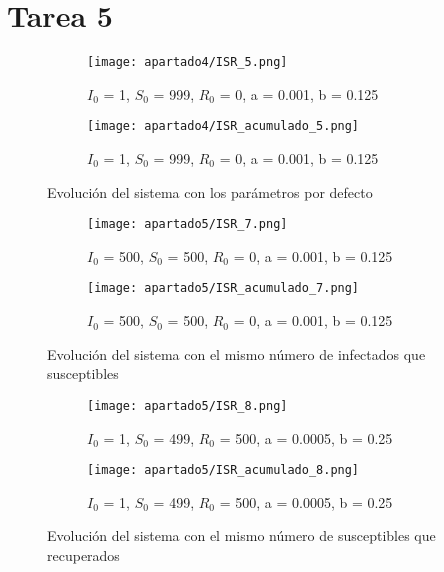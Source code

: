 \section{Tarea 5}
\begin{figure}[H]
	\centering
	\begin{subfigure}[b]{0.8\textwidth}
		\centering
		\texttt{[image: apartado4/ISR\_5.png]}
		\caption{$I_0$ = 1, $S_0$ = 999, $R_0$ = 0, a = 0.001, b = 0.125}
	\end{subfigure}
	\hfill
	\begin{subfigure}[b]{0.8\textwidth}
		\centering
		\texttt{[image: apartado4/ISR\_acumulado\_5.png]}
		\caption{$I_0$ = 1, $S_0$ = 999, $R_0$ = 0, a = 0.001, b = 0.125}
	\end{subfigure}
	\caption{Evolución del sistema con los parámetros por defecto}
\end{figure}
\begin{figure}[H]
	\centering
	\begin{subfigure}[b]{0.8\textwidth}
		\centering
		\texttt{[image: apartado5/ISR\_7.png]}
		\caption{$I_0$ = 500, $S_0$ = 500, $R_0$ = 0, a = 0.001, b = 0.125}
	\end{subfigure}
	\hfill
	\begin{subfigure}[b]{0.8\textwidth}
		\centering
		\texttt{[image: apartado5/ISR\_acumulado\_7.png]}
		\caption{$I_0$ = 500, $S_0$ = 500, $R_0$ = 0, a = 0.001, b = 0.125}
	\end{subfigure}
	\caption{Evolución del sistema con el mismo número de infectados que susceptibles}
\end{figure}
\begin{figure}[H]
	\centering
	\begin{subfigure}[b]{0.8\textwidth}
		\centering
		\texttt{[image: apartado5/ISR\_8.png]}
		\caption{$I_0$ = 1, $S_0$ = 499, $R_0$ = 500, a = 0.0005, b = 0.25}
	\end{subfigure}
	\hfill
	\begin{subfigure}[b]{0.8\textwidth}
		\centering
		\texttt{[image: apartado5/ISR\_acumulado\_8.png]}
		\caption{$I_0$ = 1, $S_0$ = 499, $R_0$ = 500, a = 0.0005, b = 0.25}
	\end{subfigure}
	\caption{Evolución del sistema con el mismo número de susceptibles que recuperados}
\end{figure}

